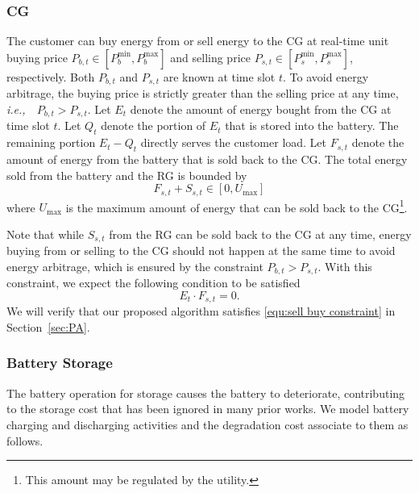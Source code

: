 \documentclass[journal]{IEEEtran}
\def\ie{{\it i.e.,\ \/}}
\begin{document}
\subsubsection{CG} The customer can buy energy from or sell energy to the CG at real-time unit  buying price $P_{b,t}\in[P_{b}^{\min}, P_{b}^{\max}]$ and selling price $P_{s,t} \in [P_{s}^{\min}, P_{s}^{\max}]$, respectively. Both $P_{b,t}$ and $P_{s,t}$ are known at time slot $t$. To avoid energy arbitrage,
the buying price is strictly greater than the selling price at any time, \ie\  $P_{b,t}>P_{s,t}$. Let $E_t$ denote the amount of energy bought from the CG at time slot $t$. Let $Q_t$ denote the portion of $E_t$ that is stored into the battery. The remaining portion $E_t-Q_t$  directly  serves the customer load. Let $F_{s,t}$ denote the amount of energy  from the battery that is sold back to the CG. The total energy sold  from the battery and the RG is bounded by
\begin{equation}
\label{equ:Et_constraint}
F_{s,t}+S_{s,t} \in[0,U_{\max}]
\end{equation}
where $U_{\max}$ is the maximum amount of energy that can be sold back to the CG\footnote{This amount may be regulated by the utility.}.

Note that while  $S_{s,t}$ from the RG can be sold back to the CG at any time, energy buying from or selling  to the CG should not happen at the same time to avoid energy arbitrage, which is ensured by the constraint $P_{b,t}>P_{s,t}$. With this constraint, we expect the following condition to be satisfied
\begin{equation}
\label{equ:sell buy constraint}
E_t\cdot F_{s,t}=0.
\end{equation}
We will verify that our proposed algorithm satisfies \eqref{equ:sell buy constraint} in Section~\ref{sec:PA}. 



\subsubsection{Battery Storage} The battery operation for storage  causes the battery to deteriorate, contributing to the storage cost that has been ignored in many prior works. We model battery charging and discharging activities and the degradation cost associate to them as follows.
\end{document}
